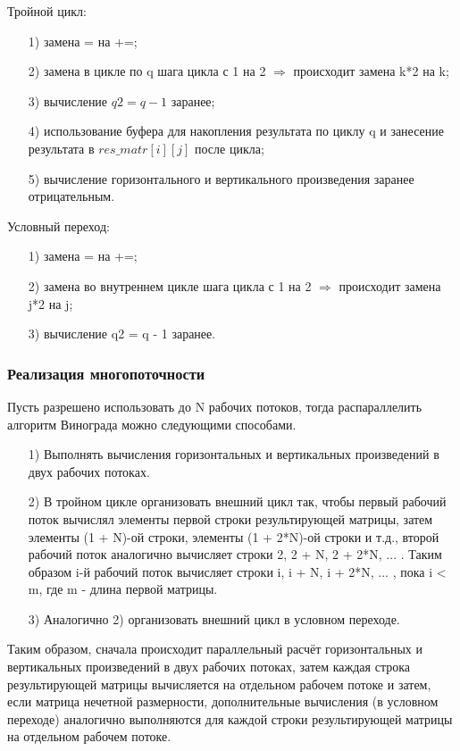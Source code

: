 \documentclass[a4paper,12pt]{article}
\begin{document}
	Тройной цикл:
	\begin{enumerate} 
	\item[1)] замена = на +=;
	\item[2)] замена в цикле по q шага цикла с 1 на 2 $\Rightarrow$ происходит замена k*2 на k;
	\item[3)] вычисление $q2 = q - 1$ заранее;
	\item[4)] использование буфера для накопления результата по циклу q и занесение результата в $res\_matr[i][j]$ после цикла;
	\item[5)] вычисление горизонтального и вертикального произведения заранее отрицательным.

	\end{enumerate}
	
	Условный переход:
	\begin{enumerate} 
	\item[1)] замена = на +=;
	\item[2)] замена во внутреннем цикле шага цикла с 1 на 2 $\Rightarrow$ происходит замена j*2 на j;
	\item[3)] вычисление q2 = q - 1 заранее.
	\end{enumerate}
    
    \subsubsection{Реализация многопоточности}
    Пусть разрешено использовать до N рабочих потоков, тогда распараллелить алгоритм Винограда можно следующими способами.
	  \begin{enumerate}
	  \item[1)] Выполнять вычисления горизонтальных и вертикальных произведений в двух рабочих потоках.
	  \item[2)] В тройном цикле организовать внешний цикл так, чтобы первый рабочий поток вычислял элементы первой строки результирующей матрицы, затем элементы (1 + N)-ой строки, элементы (1 + 2*N)-ой строки и т.д., второй рабочий поток аналогично вычисляет строки 2, 2 + N, 2 + 2*N, ... . Таким образом i-й рабочий поток вычисляет строки i, i + N, i + 2*N, ... , пока i < m, где m - длина первой матрицы.
	  \item[3)] Аналогично 2) организовать внешний цикл в условном переходе.
	  \end{enumerate}
	  
	  Таким образом, сначала происходит параллельный расчёт горизонтальных и вертикальных произведений в двух рабочих потоках, затем каждая строка результирующей матрицы вычисляется на отдельном рабочем потоке и затем, если матрица нечетной размерности, дополнительные вычисления (в условном переходе) аналогично выполняются для каждой строки результирующей матрицы на отдельном рабочем потоке.
	    
\end{document}
